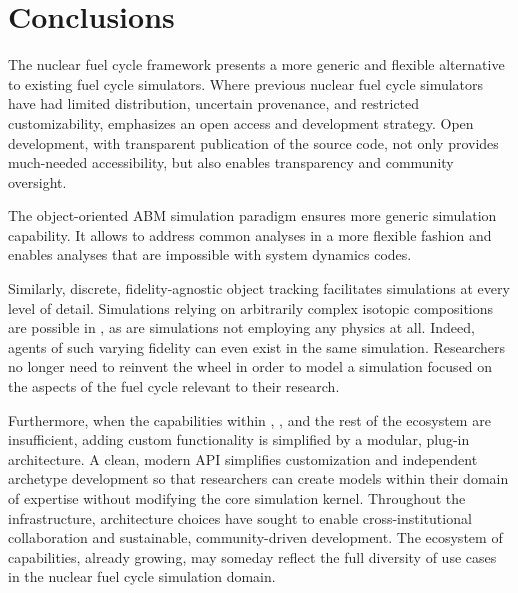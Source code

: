 

\section{Conclusions}


The \Cyclus nuclear fuel cycle framework presents a more generic and flexible 
alternative to existing fuel cycle simulators. Where previous nuclear fuel cycle simulators have had limited distribution, 
uncertain provenance, and restricted customizability, \Cyclus emphasizes an 
open access and development strategy.  Open development, with transparent 
publication of the source code, not only provides much-needed accessibility, 
but also enables transparency and community oversight. 

The object-oriented \acrlong{ABM} simulation paradigm ensures more generic 
simulation capability. It allows \Cyclus to address common analyses in a more 
flexible fashion and enables analyses that are impossible with system dynamics 
codes. 

Similarly, discrete, fidelity-agnostic object tracking facilitates simulations 
at every level of detail. Simulations relying on arbitrarily complex isotopic 
compositions are possible in \Cyclus, as are simulations not employing any 
physics at all. Indeed, agents of such varying fidelity can even exist in the 
same simulation. Researchers no longer need to reinvent the wheel in order to 
model a simulation focused on the aspects of the fuel cycle
relevant to their research.

Furthermore, when the capabilities within \Cyclus, \Cycamore, and the rest of 
the ecosystem are insufficient, adding custom functionality is simplified by a 
modular, plug-in architecture. A clean, modern \gls{API} simplifies 
customization and independent archetype development so that researchers can 
create models within their domain of expertise without modifying the core 
simulation kernel. Throughout the \Cyclus 
infrastructure, architecture choices have sought to enable cross-institutional 
collaboration and sustainable, community-driven development. The ecosystem 
of capabilities, already growing, may someday reflect the full diversity of use 
cases in the nuclear fuel cycle simulation domain.


